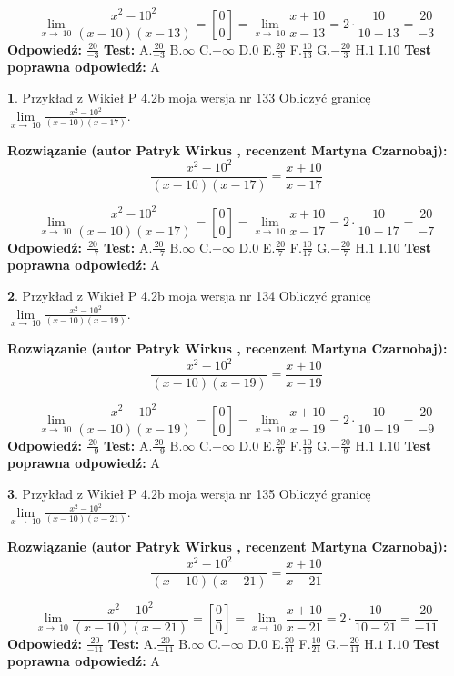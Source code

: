 \documentclass[12pt, a4paper]{article}
\theoremstyle{definition} %
\newtheorem{zad}{}
\newcommand{\zadStart}[1]{\begin{zad}#1\newline}
\newcommand{\zadStop}{\end{zad}}
\newcommand{\rozwStart}[2]{\noindent \textbf{Rozwiązanie (autor #1 , recenzent #2): }\newline}
\newcommand{\rozwStop}{\newline}
\newcommand{\odpStart}{\noindent \textbf{Odpowiedź:}\newline}
\newcommand{\odpStop}{\newline}
\newcommand{\testStart}{\noindent \textbf{Test:}\newline}
\newcommand{\testStop}{\newline}
\newcommand{\kluczStart}{\noindent \textbf{Test poprawna odpowiedź:}\newline}
\newcommand{\kluczStop}{\newline}
\begin{document}
$$\lim\limits_{x\to\ 10}\frac{x^{2}-10^{2}}{(x-10)(x-13)}=[\frac{0}{0}]=\lim\limits_{x\to\ 10}\frac{x+10}{x-13}=2 \cdot \frac{10}{10-13} = \frac{20}{-3}$$
\rozwStop
\odpStart
$\frac{20}{-3}$
\odpStop
\testStart
A.$\frac{20}{-3}$
B.$\infty$
C.$-\infty$
D.$0$
E.$\frac{20}{3}$
F.$\frac{10}{13}$
G.$-\frac{20}{3}$
H.$1$
I.$10$
\testStop
\kluczStart
A
\kluczStop



\zadStart{Przykład z Wikieł P 4.2b moja wersja nr 133}
Obliczyć granicę $\lim\limits_{x\to\ 10}\frac{x^{2}-10^{2}}{(x-10)(x-17)}$.
\zadStop
\rozwStart{Patryk Wirkus}{Martyna Czarnobaj}
$$\frac{x^{2}-10^{2}}{(x-10)(x-17)}=\frac{x+10}{x-17}$$

$$\lim\limits_{x\to\ 10}\frac{x^{2}-10^{2}}{(x-10)(x-17)}=[\frac{0}{0}]=\lim\limits_{x\to\ 10}\frac{x+10}{x-17}=2 \cdot \frac{10}{10-17} = \frac{20}{-7}$$
\rozwStop
\odpStart
$\frac{20}{-7}$
\odpStop
\testStart
A.$\frac{20}{-7}$
B.$\infty$
C.$-\infty$
D.$0$
E.$\frac{20}{7}$
F.$\frac{10}{17}$
G.$-\frac{20}{7}$
H.$1$
I.$10$
\testStop
\kluczStart
A
\kluczStop



\zadStart{Przykład z Wikieł P 4.2b moja wersja nr 134}
Obliczyć granicę $\lim\limits_{x\to\ 10}\frac{x^{2}-10^{2}}{(x-10)(x-19)}$.
\zadStop
\rozwStart{Patryk Wirkus}{Martyna Czarnobaj}
$$\frac{x^{2}-10^{2}}{(x-10)(x-19)}=\frac{x+10}{x-19}$$

$$\lim\limits_{x\to\ 10}\frac{x^{2}-10^{2}}{(x-10)(x-19)}=[\frac{0}{0}]=\lim\limits_{x\to\ 10}\frac{x+10}{x-19}=2 \cdot \frac{10}{10-19} = \frac{20}{-9}$$
\rozwStop
\odpStart
$\frac{20}{-9}$
\odpStop
\testStart
A.$\frac{20}{-9}$
B.$\infty$
C.$-\infty$
D.$0$
E.$\frac{20}{9}$
F.$\frac{10}{19}$
G.$-\frac{20}{9}$
H.$1$
I.$10$
\testStop
\kluczStart
A
\kluczStop



\zadStart{Przykład z Wikieł P 4.2b moja wersja nr 135}
Obliczyć granicę $\lim\limits_{x\to\ 10}\frac{x^{2}-10^{2}}{(x-10)(x-21)}$.
\zadStop
\rozwStart{Patryk Wirkus}{Martyna Czarnobaj}
$$\frac{x^{2}-10^{2}}{(x-10)(x-21)}=\frac{x+10}{x-21}$$

$$\lim\limits_{x\to\ 10}\frac{x^{2}-10^{2}}{(x-10)(x-21)}=[\frac{0}{0}]=\lim\limits_{x\to\ 10}\frac{x+10}{x-21}=2 \cdot \frac{10}{10-21} = \frac{20}{-11}$$
\rozwStop
\odpStart
$\frac{20}{-11}$
\odpStop
\testStart
A.$\frac{20}{-11}$
B.$\infty$
C.$-\infty$
D.$0$
E.$\frac{20}{11}$
F.$\frac{10}{21}$
G.$-\frac{20}{11}$
H.$1$
I.$10$
\testStop
\kluczStart
A
\kluczStop
\end{document}
